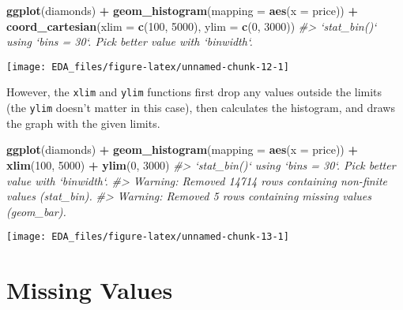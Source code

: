 \documentclass[]{book}
\newenvironment{Shaded}{\begin{snugshade}}{\end{snugshade}}
\newcommand{\CommentTok}[1]{\textcolor[rgb]{0.56,0.35,0.01}{\textit{#1}}}
\newcommand{\DataTypeTok}[1]{\textcolor[rgb]{0.13,0.29,0.53}{#1}}
\newcommand{\DecValTok}[1]{\textcolor[rgb]{0.00,0.00,0.81}{#1}}
\newcommand{\KeywordTok}[1]{\textcolor[rgb]{0.13,0.29,0.53}{\textbf{#1}}}
\newcommand{\NormalTok}[1]{#1}
\newcommand{\OperatorTok}[1]{\textcolor[rgb]{0.81,0.36,0.00}{\textbf{#1}}}
\newcommand{\StringTok}[1]{\textcolor[rgb]{0.31,0.60,0.02}{#1}}
\theoremstyle{definition}
\theoremstyle{definition}
\theoremstyle{definition}
\theoremstyle{remark}
\begin{document}
\begin{Shaded}
\begin{Highlighting}[]
\KeywordTok{ggplot}\NormalTok{(diamonds) }\OperatorTok{+}
\StringTok{  }\KeywordTok{geom_histogram}\NormalTok{(}\DataTypeTok{mapping =} \KeywordTok{aes}\NormalTok{(}\DataTypeTok{x =}\NormalTok{ price)) }\OperatorTok{+}
\StringTok{  }\KeywordTok{coord_cartesian}\NormalTok{(}\DataTypeTok{xlim =} \KeywordTok{c}\NormalTok{(}\DecValTok{100}\NormalTok{, }\DecValTok{5000}\NormalTok{), }\DataTypeTok{ylim =} \KeywordTok{c}\NormalTok{(}\DecValTok{0}\NormalTok{, }\DecValTok{3000}\NormalTok{))}
\CommentTok{#> `stat_bin()` using `bins = 30`. Pick better value with `binwidth`.}
\end{Highlighting}
\end{Shaded}

\begin{center}\texttt{[image: EDA\_files/figure-latex/unnamed-chunk-12-1]} \end{center}

However, the \texttt{xlim} and \texttt{ylim} functions first drop any
values outside the limits (the \texttt{ylim} doesn't matter in this
case), then calculates the histogram, and draws the graph with the given
limits.

\begin{Shaded}
\begin{Highlighting}[]
\KeywordTok{ggplot}\NormalTok{(diamonds) }\OperatorTok{+}
\StringTok{  }\KeywordTok{geom_histogram}\NormalTok{(}\DataTypeTok{mapping =} \KeywordTok{aes}\NormalTok{(}\DataTypeTok{x =}\NormalTok{ price)) }\OperatorTok{+}
\StringTok{  }\KeywordTok{xlim}\NormalTok{(}\DecValTok{100}\NormalTok{, }\DecValTok{5000}\NormalTok{) }\OperatorTok{+}
\StringTok{  }\KeywordTok{ylim}\NormalTok{(}\DecValTok{0}\NormalTok{, }\DecValTok{3000}\NormalTok{)}
\CommentTok{#> `stat_bin()` using `bins = 30`. Pick better value with `binwidth`.}
\CommentTok{#> Warning: Removed 14714 rows containing non-finite values (stat_bin).}
\CommentTok{#> Warning: Removed 5 rows containing missing values (geom_bar).}
\end{Highlighting}
\end{Shaded}

\begin{center}\texttt{[image: EDA\_files/figure-latex/unnamed-chunk-13-1]} \end{center}

\hypertarget{missing-values}{%
\section{Missing Values}\label{missing-values}}
\end{document}
